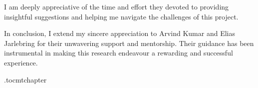 I am deeply appreciative of the time and effort they devoted to providing insightful suggestions and helping me navigate the challenges of this project.

In conclusion, I extend my sincere appreciation to Arvind Kumar and Elias Jarlebring for their unwavering support and mentorship. Their guidance has been instrumental in making this research endeavour a rewarding and successful experience.

\newpage



\newpage

\etocdepthtag.toc{mtchapter}
\thispagestyle{plain}
\tableofcontents

\newpage



